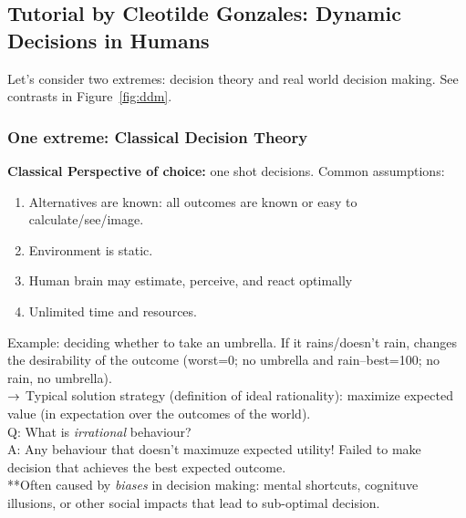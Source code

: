 \spacerule


\subsection{Tutorial by Cleotilde Gonzales: Dynamic Decisions in Humans}

Let's consider two extremes: decision theory and real world decision making. See contrasts in Figure~\ref{fig:ddm}.

\subsubsection{One extreme: Classical Decision Theory}

{\bf Classical Perspective of choice:} one shot decisions. Common assumptions:
    \begin{enumerate}
        \item Alternatives are known: all outcomes are known or easy to calculate/see/image.
        \item Environment is static.
        \item Human brain may estimate, perceive, and react optimally
        \item Unlimited time and resources.
    \end{enumerate}

Example: deciding whether to take an umbrella. If it rains/doesn't rain, changes the desirability of the outcome (worst=0; no umbrella and rain--best=100; no rain, no umbrella). \\

$\rightarrow$ Typical solution strategy (definition of ideal rationality): maximize expected value (in expectation over the outcomes of the world). \\

Q: What is {\it irrational} behaviour? \\

A: Any behaviour that doesn't maximuze expected utility! Failed to make decision that achieves the best expected outcome. \\

**Often caused by {\it biases} in decision making: mental shortcuts, cognituve illusions, or other social impacts that lead to sub-optimal decision. \\


